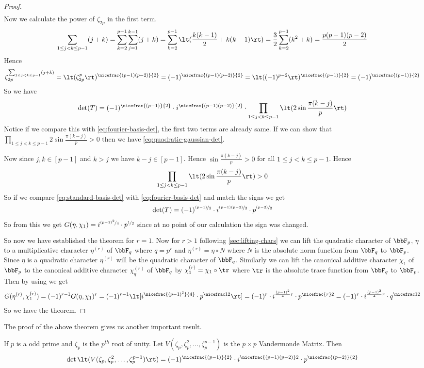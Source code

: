 \begin{proof}
\begin{align*}
  \end{align*}
  Now we calculate the power of $\zeta_{2p}$ in the first term. $$\sum_{1\leq j<k\leq p-1}(j+k)=\sum_{k=2}^{p-1}\sum_{j=1}^{k-1}(j+k)=\sum_{k=2}^{p-1}\lt(\frac{k(k-1)}2+k(k-1)\rt)=\frac32\sum_{k=2}^{p-1}(k^2+k)=\frac{p(p-1)(p-2)}2$$Hence $$\zeta_{2p}^{\sum_{1\leq j<k\leq p-1}(j+k)} = \lt(\zeta_{2p}^p\rt)^{\nicefrac{(p-1)(p-2)}{2}}=(-1)^{\nicefrac{(p-1)(p-2)}{2}}=\lt((-1)^{p-2}\rt)^{\nicefrac{(p-1)}{2}}=(-1)^{\nicefrac{(p-1)}{2}}$$So we have \begin{equation}\label{eq:standard-basis-det}
    \det(T)=(-1)^{\nicefrac{(p-1)}{2}}\cdot i^{\nicefrac{(p-1)(p-2)}{2}}\cdot \prod_{1\leq j<k\leq p-1} \lt(2\sin\frac{\pi(k-j)}{p}\rt)
  \end{equation}Notice if we compare this with \eqref{eq:fourier-basis-det}, the first two terms are already same. If we can show that $\prod_{1\leq j<k\leq p-1} 2\sin\frac{\pi(k-j)}{p}>0$ then we have \eqref{eq:quadratic-gaussian-det}. 
  
  Now since $j,k\in[p-1]$ and $k>j$ we have $k-j\in[p-1]$. Hence $\sin\frac{\pi(k-j)}{p}>0$ for all $1\leq j<k\leq p-1$. Hence $$\prod_{1\leq j<k\leq p-1} \lt(2\sin\frac{\pi(k-j)}{p}\rt) >0$$ So if we compare \eqref{eq:standard-basis-det} with \eqref{eq:fourier-basis-det} and match the signs we get $$\det(T)=(-1)^{\nicefrac{(p-1)}{2}}\cdot i^{\nicefrac{(p-1)(p-2)}2}\cdot p^{\nicefrac{(p-2)}{2}}$$So from this we get $G(\eta,\chi_1)=i^{\nicefrac{(p-1)^2}{4}}\cdot p^{\nicefrac12}$ since at no point of our calculation the sign was changed. 

  So now we have established the theorem for $r=1$. Now for $r>1$ following \autoref{sec:lifting-chars} we can lift the quadratic character of $\bbF_p$, $\eta$ to a multiplicative character $\eta^{(r)}$ of $\bbF_q$ where $q=p^r$ and $\eta^{(r)}=\eta\circ N$ where $N$ is the absolute norm function from $\bbF_q$ to $\bbF_p$. Since $\eta$ is a quadratic character $\eta^{(r)}$ will be the quadratic character of $\bbF_q$. Similarly we can lift the canonical additive character $\chi_1$ of $\bbF_p$ to the canonical additive character $\chi_q^{(r)}$ of $\bbF_q$ by $\chi_1^{(r)}=\chi_1\circ \tr$ where $\tr$ is the absolute trace function from $\bbF_q$ to $\bbF_p$. Then by using \DHthm we get $$    G(\eta^{(r)},\chi_1^{(r)}) = (-1)^{r-1}G(\eta,\chi_1)^r = (-1)^{r-1}\lt[i^{\nicefrac{(p-1)^2}{4}}\cdot p^{\nicefrac12}\rt]=(-1)^r \cdot i^{\frac{(p-1)^2}{4}r}\cdot p^{\nicefrac{r}2}=(-1)^r \cdot i^{\frac{(p-1)^2}{4}r}\cdot q^{\nicefrac12}$$So we have the theorem.
\end{proof}

The proof of the above theorem gives us another important result. 
\begin{lemma}{}{}
  If $p$ is a odd prime and $\zeta_p$ is the $p^{th}$ root of unity. Let $V(\zeta_p,\zeta_p^2,\dots,\zeta_p^{p-1})$ is the $p\times p$ Vandermonde Matrix. Then $$\det\lt(V(\zeta_p,\zeta_p^2,\dots,\zeta_p^{p-1})\rt)=(-1)^{\nicefrac{(p-1)}{2}}\cdot i^{\nicefrac{(p-1)(p-2)}2}\cdot p^{\nicefrac{(p-2)}{2}}$$
\end{lemma}